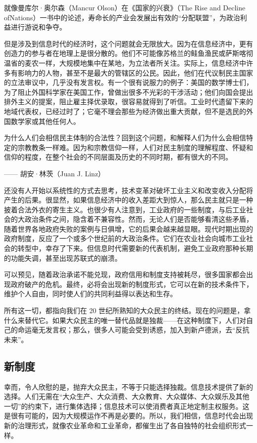 就像曼库尔·奥尔森（Mancur Olson）在《国家的兴衰》（The Rise and Decline ofNations）一书中的论述，寿命长的产业会发展出有效的“分配联盟”，为政治利益进行游说和争夺。

但是涉及到信息时代的经济时，这个问题就会无限放大。因为在信息经济中，更有创造力的参与者在地理上是很分散的。他们不可能像苏格兰的鲑鱼渔民或萨斯喀彻温省的麦农一样，大规模地集中在某地，为立法者所关注。实际上，信息经济中许多有影响力的人物，甚至不是最大的管辖区的公民。因此，他们在代议制民主国家的立法审议中，几乎没有发言权。有一个很有说服力的例子：美国的数学博士们，为了阻止外国科学家在美国工作，曾做出很多不光彩的干涉活动；他们向国会提出排外主义的提案，阻止雇主择优录取，很容易就得到了听信。工业时代遗留下来的地域代表权，已经过时了；它毫不理会那些为经济做出重大贡献，但不是选民的外国数学家或其他任何人。

\begin{tcolorbox}
为什么人们会相信民主体制的合法性？回到这个问题，和解释人们为什么会相信特定的宗教教条一样难。因为和宗教信仰一样，人们对民主制度的理解程度、怀疑和信仰的程度，在整个社会的不同层面及历史的不同时期，都有很大的不同。
\begin{flushright}
—— 胡安·林茨（Juan J. Linz）
\end{flushright}
\end{tcolorbox}

还没有人开始以系统性的方式去思考，技术变革对破坏工业主义和改变收入分配将产生的后果。很显然，如果信息经济中的收入差距大到惊人，那么民主就只是一种披着合法外衣的寄生主义。也很少有人注意到，工业政府的一些制度，与后工业社会的大政治条件之间，隐含着不兼容性。然而，无论人们是否能够看清这些矛盾，随着世界各地政府失败的案例与日俱增，它的后果会越来越显眼。现代时期出现的政府制度，反应了一个或多个世纪前的大政治条件。它们在农业社会向城市工业社会的转型中，幸存了下来。但信息时代需要新的代表机制，避免工业政府那种长期的功能失调，甚至出现苏联式的崩溃。

可以预见，随着政治承诺不能兑现，政府信用和制度支持被耗尽，很多国家都会出现政府破产的危机。最终，必将会出现新的制度形式，它可以在新的技术条件下，维护个人自由，同时使人们的共同利益得以表达和生存。

所有这一切，都指向我们在 20 世纪所熟知的大众民主的终结。现在的问题是，拿什么来替代它。如果大众民主的唯一替代品就是独裁——在这种制度下，人们对自己的命运毫无发言权；那么，很多人可能会受到诱惑，加入到新卢德派，去“反抗未来”。

\subsection{新制度}
幸而，令人欣慰的是，抛弃大众民主，不等于只能选择独裁。信息技术提供了新的选择。人们无需在“大众生产、大众消费、大众教育、大众媒体、大众娱乐及其他一切”的约束下，进行集体选择；信息技术可以使消费者真正地定制主权服务。这是很有可能的，因为大规模运作不再是必要的。所以，我们相信，信息时代会出现新的治理形式，就像农业革命和工业革命，都催生出了各自独特的社会组织形式一样。

